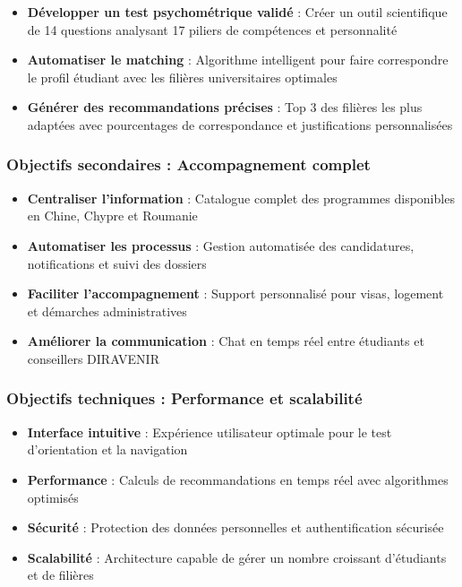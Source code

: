 \documentclass[12pt,a4paper]{report}
\begin{document}
\begin{itemize}
    \item \textbf{Développer un test psychométrique validé} : Créer un outil scientifique de 14 questions analysant 17 piliers de compétences et personnalité
    \item \textbf{Automatiser le matching} : Algorithme intelligent pour faire correspondre le profil étudiant avec les filières universitaires optimales
    \item \textbf{Générer des recommandations précises} : Top 3 des filières les plus adaptées avec pourcentages de correspondance et justifications personnalisées
\end{itemize}

\subsubsection{Objectifs secondaires : Accompagnement complet}

\begin{itemize}
    \item \textbf{Centraliser l'information} : Catalogue complet des programmes disponibles en Chine, Chypre et Roumanie
    \item \textbf{Automatiser les processus} : Gestion automatisée des candidatures, notifications et suivi des dossiers
    \item \textbf{Faciliter l'accompagnement} : Support personnalisé pour visas, logement et démarches administratives
    \item \textbf{Améliorer la communication} : Chat en temps réel entre étudiants et conseillers DIRAVENIR
\end{itemize}

\subsubsection{Objectifs techniques : Performance et scalabilité}

\begin{itemize}
    \item \textbf{Interface intuitive} : Expérience utilisateur optimale pour le test d'orientation et la navigation
    \item \textbf{Performance} : Calculs de recommandations en temps réel avec algorithmes optimisés
    \item \textbf{Sécurité} : Protection des données personnelles et authentification sécurisée
    \item \textbf{Scalabilité} : Architecture capable de gérer un nombre croissant d'étudiants et de filières
\end{itemize}
\end{document}

